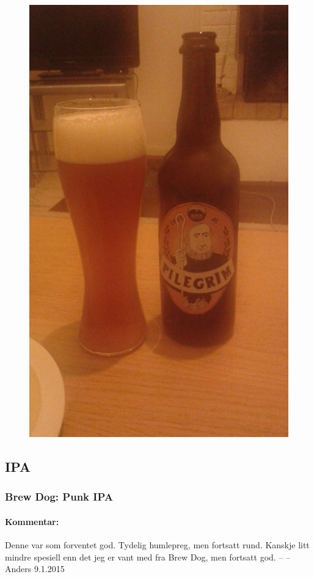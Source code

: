\documentclass[12pt,a4paper,oneside,norsk]{article}
\begin{document}
\begin{figure} [H]
\centering
\includegraphics[scale=0.2, angle=270]{Bilder/Ol/kinnpilegrim.jpg}
\end{figure}  

\newpage
\subsection{IPA}
\subsubsection{Brew Dog: Punk IPA}
\paragraph{Kommentar:} Denne var som forventet god. Tydelig humlepreg, men fortsatt rund. Kanskje litt mindre spesiell enn det jeg er vant med fra Brew Dog, men fortsatt god. 
\newline
-- -- Anders 9.1.2015
\end{document}
